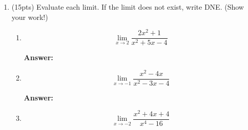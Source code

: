\documentclass[fleqn,12pt]{article}
\newcommand{\<}{\ensuremath{\langle}}
\renewcommand{\>}{\ensuremath{\rangle}}
\begin{document}
\begin{enumerate}[label={\bf \arabic*.}]






    \newpage


  \item (15pts) Evaluate each limit. If the limit does not exist, write
    DNE. (Show your work!)
    \begin{enumerate}[label={\bf \roman*.}]


    \item 
      \label{item:2}
      \[
      \lim_{x\rightarrow 2} \frac{2x^2 + 1}{x^2 +5x - 4}
      \]

      \bigskip

      \bigskip
      \hfill {\bf Answer:} \underline{\phantom{XXXXXXX}}
      \bigskip


    \item 
      \label{item:3}
      \[
      \lim_{x\rightarrow -1} \frac{x^2 - 4x}{x^2 -3x - 4}
      \]

      \bigskip

      \bigskip
      \hfill {\bf Answer:} \underline{\phantom{XXXXXXX}}
      \bigskip


      \bigskip
    \item 
      \label{item:4}
      \[
      \lim_{x\rightarrow -2} \frac{x^2 + 4x + 4}{x^4 -16}
      \]

      \bigskip


\end{enumerate}
\end{enumerate}
\end{document}
